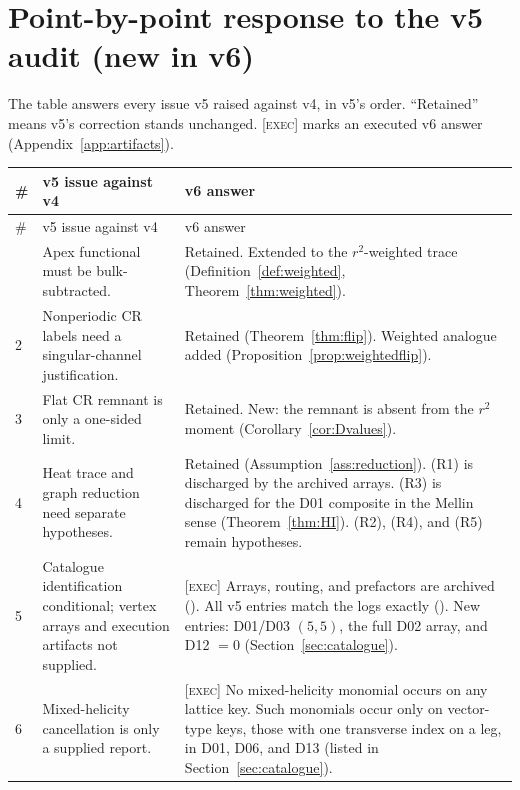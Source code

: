 \section{Point-by-point response to the v5 audit (new in v6)}
\label{sec:response}

The table answers every issue v5 raised against v4, in v5's order.
``Retained'' means v5's correction stands unchanged.
\textsc{[exec]} marks an executed v6 answer
(Appendix~\ref{app:artifacts}).

\begingroup
\small
\begin{longtable}{@{}L{.035\linewidth}L{.36\linewidth}L{.54\linewidth}@{}}
\toprule
\# & v5 issue against v4 & v6 answer\\
\midrule
\endfirsthead
\toprule
\# & v5 issue against v4 & v6 answer\\
\midrule
\endhead
\bottomrule
{} & Apex functional must be bulk-subtracted. &
Retained. Extended to the \(r^2\)-weighted trace
(Definition~\ref{def:weighted}, Theorem~\ref{thm:weighted}).\\
2 & Nonperiodic CR labels need a singular-channel justification. &
Retained (Theorem~\ref{thm:flip}). Weighted analogue added
(Proposition~\ref{prop:weightedflip}).\\
3 & Flat CR remnant is only a one-sided limit. &
Retained. New: the remnant is absent from the \(r^2\) moment
(Corollary~\ref{cor:Dvalues}).\\
4 & Heat trace and graph reduction need separate hypotheses. &
Retained (Assumption~\ref{ass:reduction}).
(R1) is discharged by the archived arrays.
(R3) is discharged for the D01 composite in the Mellin sense
(Theorem~\ref{thm:HI}).
(R2), (R4), and (R5) remain hypotheses.\\
5 & Catalogue identification conditional; vertex arrays and
execution artifacts not supplied. &
\textsc{[exec]} Arrays, routing, and prefactors are archived
().
All v5 entries match the logs exactly ().
New entries: D01/D03 \((5,5)\), the full D02 array, and D12 \(=0\)
(Section~\ref{sec:catalogue}).\\
6 & Mixed-helicity cancellation is only a supplied report. &
\textsc{[exec]} No mixed-helicity monomial occurs on any lattice
key.
Such monomials occur only on vector-type keys, those with one
transverse index on a leg, in D01, D06, and D13 (listed in
Section~\ref{sec:catalogue}).

\end{longtable}
